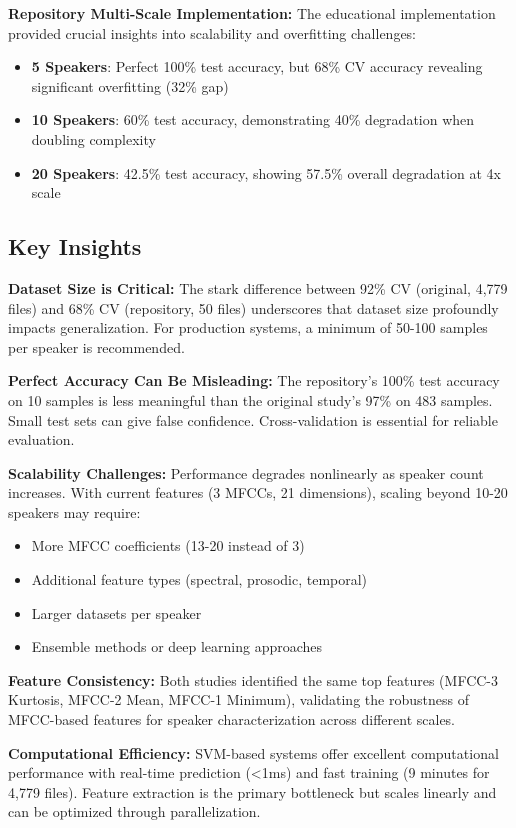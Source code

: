 \documentclass[11pt,twoside,openany]{book}
\begin{document}
\textbf{Repository Multi-Scale Implementation:} The educational implementation provided crucial insights into scalability and overfitting challenges:
\begin{itemize}[itemsep=1pt]
\item \textbf{5 Speakers}: Perfect 100\% test accuracy, but 68\% CV accuracy revealing significant overfitting (32\% gap)
\item \textbf{10 Speakers}: 60\% test accuracy, demonstrating 40\% degradation when doubling complexity
\item \textbf{20 Speakers}: 42.5\% test accuracy, showing 57.5\% overall degradation at 4x scale
\end{itemize}

\subsection{Key Insights}

\textbf{Dataset Size is Critical:} The stark difference between 92\% CV (original, 4,779 files) and 68\% CV (repository, 50 files) underscores that dataset size profoundly impacts generalization. For production systems, a minimum of 50-100 samples per speaker is recommended.

\textbf{Perfect Accuracy Can Be Misleading:} The repository's 100\% test accuracy on 10 samples is less meaningful than the original study's 97\% on 483 samples. Small test sets can give false confidence. Cross-validation is essential for reliable evaluation.

\textbf{Scalability Challenges:} Performance degrades nonlinearly as speaker count increases. With current features (3 MFCCs, 21 dimensions), scaling beyond 10-20 speakers may require:
\begin{itemize}[itemsep=1pt]
\item More MFCC coefficients (13-20 instead of 3)
\item Additional feature types (spectral, prosodic, temporal)
\item Larger datasets per speaker
\item Ensemble methods or deep learning approaches
\end{itemize}

\textbf{Feature Consistency:} Both studies identified the same top features (MFCC-3 Kurtosis, MFCC-2 Mean, MFCC-1 Minimum), validating the robustness of MFCC-based features for speaker characterization across different scales.

\textbf{Computational Efficiency:} SVM-based systems offer excellent computational performance with real-time prediction (<1ms) and fast training (9 minutes for 4,779 files). Feature extraction is the primary bottleneck but scales linearly and can be optimized through parallelization.
\end{document}
